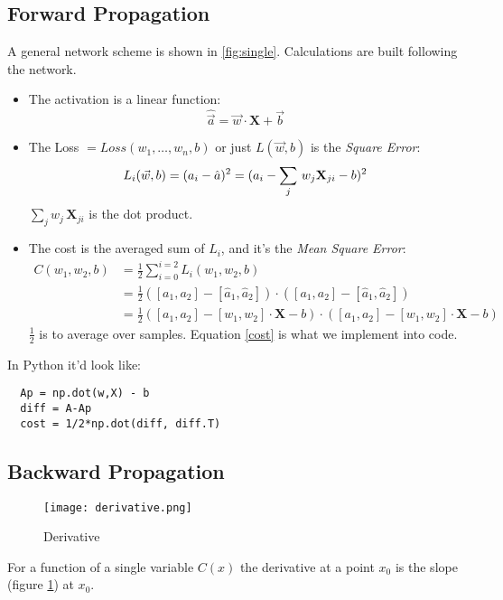 \subsection{Forward Propagation}
A general network scheme is shown in \ref{fig:single}. Calculations are built following the network. 
\begin{itemize}
  \item The activation is a linear function:
    \[ \hat{\vec{a}} = \vec{w}\cdot\mathbf{X} + \vec{b}\]
  \item The Loss $= Loss(w_1,\ldots, w_n, b)$ or just $L(\vec{w},b)$ is the \textit{Square Error}:
  \[
  L_i(\vec{w}, b) = (a_i - \hat{a})^2\\
  =(a_i -\sum_j\,w_j\mathbf{X}_{ji} -b)^2
\]
$\sum_j w_j\,\mathbf{X}_{ji}$ is the dot product.

\item The cost is the averaged sum of $L_i$, and it's the \textit{Mean Square Error}:
\begin{align}
  C(w_1, w_2, b) &= \frac{1}{2} \sum_{i=0}^{i=2} L_i(w_1, w_2, b)\nonumber\\
  &= \frac{1}{2}([a_1, a_2] - [\hat{a}_1, \hat{a}_2])\cdot{}([a_1, a_2]-[\hat{a}_1, \hat{a}_2])\nonumber\\
  &=\frac{1}{2}([a_1, a_2] - [w_1, w_2]\cdot{}\mathbf{X}-b)\cdot{}([a_1, a_2] - [w_1,w_2]\cdot{}\mathbf{X} -b) \label{cost}
\end{align}
$\frac{1}{2}$ is to average over samples. Equation \ref{cost} is what we implement into code.
\end{itemize}
In Python it'd look like:
\begin{center}
  \begin{BVerbatim}
  Ap = np.dot(w,X) - b
  diff = A-Ap 
  cost = 1/2*np.dot(diff, diff.T)
  \end{BVerbatim}
\end{center}





\subsection{Backward Propagation}
\begin{figure}
  \centering
  \texttt{[image: derivative.png]}
  \caption{Derivative}\label{fig:basics}
\end{figure}

For a function of a single variable $C(x)$ the derivative at a point $x_0$ is the slope (figure \ref{fig:basics}) at $x_0$.

